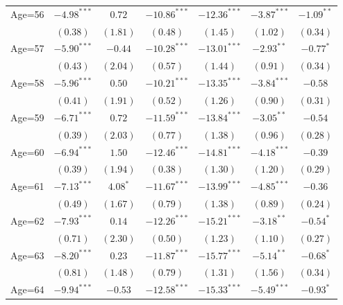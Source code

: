 \documentclass[fullpage]{paper}
\begin{document}
\begin{center}
\begin{longtable}{l c c c c c c }
Age=56      & $-4.98^{***}$ & $0.72$        & $-10.86^{***}$ & $-12.36^{***}$ & $-3.87^{***}$ & $-1.09^{**}$  \\
            & $(0.38)$      & $(1.81)$      & $(0.48)$       & $(1.45)$       & $(1.02)$      & $(0.34)$      \\
Age=57      & $-5.90^{***}$ & $-0.44$       & $-10.28^{***}$ & $-13.01^{***}$ & $-2.93^{**}$  & $-0.77^{*}$   \\
            & $(0.43)$      & $(2.04)$      & $(0.57)$       & $(1.44)$       & $(0.91)$      & $(0.34)$      \\
Age=58      & $-5.96^{***}$ & $0.50$        & $-10.21^{***}$ & $-13.35^{***}$ & $-3.84^{***}$ & $-0.58$       \\
            & $(0.41)$      & $(1.91)$      & $(0.52)$       & $(1.26)$       & $(0.90)$      & $(0.31)$      \\
Age=59      & $-6.71^{***}$ & $0.72$        & $-11.59^{***}$ & $-13.84^{***}$ & $-3.05^{**}$  & $-0.54$       \\
            & $(0.39)$      & $(2.03)$      & $(0.77)$       & $(1.38)$       & $(0.96)$      & $(0.28)$      \\
Age=60      & $-6.94^{***}$ & $1.50$        & $-12.46^{***}$ & $-14.81^{***}$ & $-4.18^{***}$ & $-0.39$       \\
            & $(0.39)$      & $(1.94)$      & $(0.38)$       & $(1.30)$       & $(1.20)$      & $(0.29)$      \\
Age=61      & $-7.13^{***}$ & $4.08^{*}$    & $-11.67^{***}$ & $-13.99^{***}$ & $-4.85^{***}$ & $-0.36$       \\
            & $(0.49)$      & $(1.67)$      & $(0.79)$       & $(1.38)$       & $(0.89)$      & $(0.24)$      \\
Age=62      & $-7.93^{***}$ & $0.14$        & $-12.26^{***}$ & $-15.21^{***}$ & $-3.18^{**}$  & $-0.54^{*}$   \\
            & $(0.71)$      & $(2.30)$      & $(0.50)$       & $(1.23)$       & $(1.10)$      & $(0.27)$      \\
Age=63      & $-8.20^{***}$ & $0.23$        & $-11.87^{***}$ & $-15.77^{***}$ & $-5.14^{**}$  & $-0.68^{*}$   \\
            & $(0.81)$      & $(1.48)$      & $(0.79)$       & $(1.31)$       & $(1.56)$      & $(0.34)$      \\
Age=64      & $-9.94^{***}$ & $-0.53$       & $-12.58^{***}$ & $-15.33^{***}$ & $-5.49^{***}$ & $-0.93^{*}$   \\

\end{longtable}
\end{center}
\end{document}
